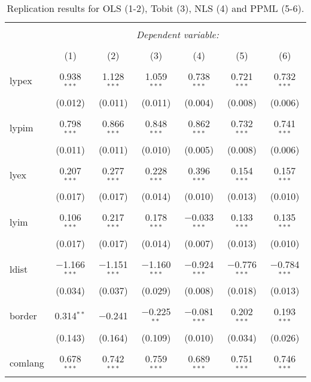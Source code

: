 \documentclass[12pt]{article}
\begin{document}
\begin{table}[!htbp] \centering 
  \caption{Replication results for OLS (1-2), Tobit (3), NLS (4) and
  PPML (5-6).} 
  \label{} 
\footnotesize 
\begin{tabular}{@{\extracolsep{5pt}}lcccccc} 
\\[-1.8ex]\hline 
\hline \\[-1.8ex] 
 & \multicolumn{6}{c}{\textit{Dependent variable:}} \\ 
\cline{2-7} 
\\[-1.8ex] & (1) & (2) & (3) & (4) & (5) & (6)\\ 
\hline \\[-1.8ex] 
 lypex & 0.938$^{***}$ & 1.128$^{***}$ & 1.059$^{***}$ & 0.738$^{***}$ & 0.721$^{***}$ & 0.732$^{***}$ \\ 
  & (0.012) & (0.011) & (0.011) & (0.004) & (0.008) & (0.006) \\ 
  & & & & & & \\ 
 lypim & 0.798$^{***}$ & 0.866$^{***}$ & 0.848$^{***}$ & 0.862$^{***}$ & 0.732$^{***}$ & 0.741$^{***}$ \\ 
  & (0.011) & (0.011) & (0.010) & (0.005) & (0.008) & (0.006) \\ 
  & & & & & & \\ 
 lyex & 0.207$^{***}$ & 0.277$^{***}$ & 0.228$^{***}$ & 0.396$^{***}$ & 0.154$^{***}$ & 0.157$^{***}$ \\ 
  & (0.017) & (0.017) & (0.014) & (0.010) & (0.013) & (0.010) \\ 
  & & & & & & \\ 
 lyim & 0.106$^{***}$ & 0.217$^{***}$ & 0.178$^{***}$ & $-$0.033$^{***}$ & 0.133$^{***}$ & 0.135$^{***}$ \\ 
  & (0.017) & (0.017) & (0.014) & (0.007) & (0.013) & (0.010) \\ 
  & & & & & & \\ 
 ldist & $-$1.166$^{***}$ & $-$1.151$^{***}$ & $-$1.160$^{***}$ & $-$0.924$^{***}$ & $-$0.776$^{***}$ & $-$0.784$^{***}$ \\ 
  & (0.034) & (0.037) & (0.029) & (0.008) & (0.018) & (0.013) \\ 
  & & & & & & \\ 
 border & 0.314$^{**}$ & $-$0.241 & $-$0.225$^{**}$ & $-$0.081$^{***}$ & 0.202$^{***}$ & 0.193$^{***}$ \\ 
  & (0.143) & (0.164) & (0.109) & (0.010) & (0.034) & (0.026) \\ 
  & & & & & & \\ 
 comlang & 0.678$^{***}$ & 0.742$^{***}$ & 0.759$^{***}$ & 0.689$^{***}$ & 0.751$^{***}$ & 0.746$^{***}$ \\ 

\end{tabular}
\end{table}
\end{document}
